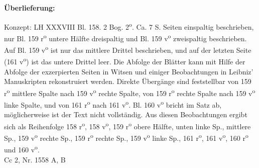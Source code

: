    
        
        \begin{ledgroupsized}[r]{120mm}
        \footnotesize 
        \pstart        
        \noindent\textbf{\"{U}berlieferung:}  
        \pend
        \end{ledgroupsized}
      
       
              \begin{ledgroupsized}[r]{114mm}
              \footnotesize 
              \pstart \parindent -6mm
              Konzept: LH XXXVIII Bl. 158. 2 Bog. 2\textsuperscript{o}. Ca. 7 S. Seiten einspaltig beschrieben, nur Bl. 159 r\textsuperscript{o} untere H\"{a}lfte dreispaltig und Bl. 159 v\textsuperscript{o} zweispaltig beschrieben. Auf Bl. 159 v\textsuperscript{o} ist nur das mittlere Drittel beschrieben, und auf der letzten Seite (161 v\textsuperscript{o}) ist das untere Drittel leer. Die Abfolge der Bl\"{a}tter kann mit Hilfe der Abfolge der exzerpierten Seiten in Witsen und einiger Beobachtungen in Leibniz' Manuskripten rekonstruiert werden. Direkte \"{U}berg\"{a}nge sind feststellbar von 159 r\textsuperscript{o} mittlere Spalte nach 159 v\textsuperscript{o} rechte Spalte, von 159 r\textsuperscript{o} rechte Spalte nach 159 v\textsuperscript{o} linke Spalte, und von 161 r\textsuperscript{o} nach 161 v\textsuperscript{o}. Bl. 160 v\textsuperscript{o} bricht im Satz ab, m\"{o}glicherweise ist der Text nicht vollst\"{a}ndig. Aus diesen Beobachtungen ergibt sich als Reihenfolge 158 r\textsuperscript{o}, 158 v\textsuperscript{o}, 159 r\textsuperscript{o} obere H\"{a}lfte, unten linke Sp., mittlere Sp., 159 v\textsuperscript{o} rechte Sp., 159 r\textsuperscript{o} rechte Sp., 159 v\textsuperscript{o} linke Sp., 161 r\textsuperscript{o}, 161 v\textsuperscript{o}, 160 r\textsuperscript{o} und 160 v\textsuperscript{o}.\\Cc 2, Nr. 1558 A, B \pend
              \end{ledgroupsized}
        \vspace*{5mm}
